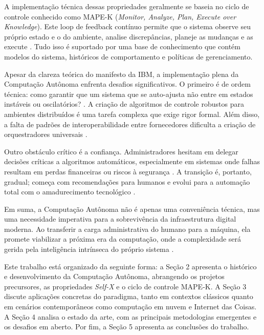 A implementação técnica dessas propriedades geralmente se baseia no ciclo de controle conhecido como MAPE-K (\textit{Monitor, Analyze, Plan, Execute over Knowledge}). Este loop de feedback contínuo permite que o sistema observe seu próprio estado e o do ambiente, analise discrepâncias, planeje as mudanças e as execute \cite{lalanda2013}. Tudo isso é suportado por uma base de conhecimento que contém modelos do sistema, históricos de comportamento e políticas de gerenciamento.

Apesar da clareza teórica do manifesto da IBM, a implementação plena da Computação Autônoma enfrenta desafios significativos. O primeiro é de ordem técnica: como garantir que um sistema que se auto-ajusta não entre em estados instáveis ou oscilatórios? \cite{correa2007}. A criação de algoritmos de controle robustos para ambientes distribuídos é uma tarefa complexa que exige rigor formal. Além disso, a falta de padrões de interoperabilidade entre fornecedores dificulta a criação de orquestradores universais \cite{kephart2003}.

Outro obstáculo crítico é a confiança. Administradores hesitam em delegar decisões críticas a algoritmos automáticos, especialmente em sistemas onde falhas resultam em perdas financeiras ou riscos à segurança \cite{kephart2003}. A transição é, portanto, gradual; começa com recomendações para humanos e evolui para a automação total com o amadurecimento tecnológico \cite{correa2007}.

Em suma, a Computação Autônoma não é apenas uma conveniência técnica, mas uma necessidade imperativa para a sobrevivência da infraestrutura digital moderna. Ao transferir a carga administrativa do humano para a máquina, ela promete viabilizar a próxima era da computação, onde a complexidade será gerida pela inteligência intrínseca do próprio sistema \cite{ibm2001, sterritt2005}.

Este trabalho está organizado da seguinte forma: a Seção 2 apresenta o histórico e desenvolvimento da Computação Autônoma, abrangendo os projetos precursores, as propriedades \textit{Self-X} e o ciclo de controle MAPE-K. A Seção 3 discute aplicações concretas do paradigma, tanto em contextos clássicos quanto em cenários contemporâneos como computação em nuvem e Internet das Coisas. A Seção 4 analisa o estado da arte, com as principais metodologias emergentes e os desafios em aberto. Por fim, a Seção 5 apresenta as conclusões do trabalho.
